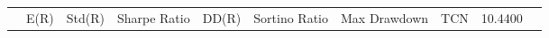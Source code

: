 \begin{tabular}{lrrrrrrrrr}
 & E(R) & Std(R) & Sharpe Ratio & DD(R) & Sortino Ratio & Max Drawdown & %
TCN & 10.4400%
\end{tabular}
